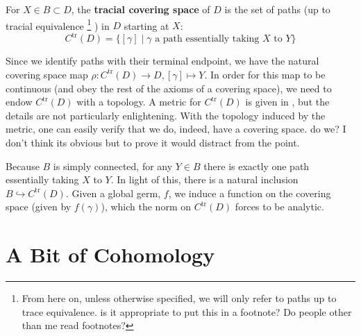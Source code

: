 \begin{definition}%
\label{def:trcover}
  For \(X \in B \subset D\), the \textbf{tracial covering space} of \(D\) is the
  set of paths (up to tracial equivalence
  \footnote{From here on, unless otherwise specified, we will only refer to
    paths up to trace equivalence. {\color{red} is it appropriate to put this in
    a footnote? Do people other than me read footnotes?} }
  ) in \(D\) starting at \(X\):
  \[
    C^{\textrm{tr}}(D) = \{[\gamma] \mid \gamma \text{ a path essentially taking
    \(X\) to \(Y\)}\}
  \]
\end{definition}

Since we identify paths with their terminal endpoint, we have the natural
covering space map \(\rho: C^{\textrm{tr}}(D) \to D, [\gamma]\mapsto Y\). In order
for this map to be continuous (and obey the rest of the axioms of a covering
space), we need to endow \(C^{\textrm{tr}}(D)\) with a topology. A metric for
\(C^{\textrm{tr}}(D)\) is given in
\cite{pascoeFreeNoncommutativePrincipal2020}, but the details are not
particularly enlightening. With the topology induced by the metric, one can
easily verify that we do, indeed, have a covering space. {\color{red} do we? I
  don't think its obvious but to prove it would distract from the point.}

Because \(B\) is simply connected, for any \(Y \in B\) there is exactly one path
essentially taking \(X\) to \(Y\). In light of this, there is a natural
inclusion \(B \hookrightarrow C^{\textrm{tr}}(D)\). Given a global germ, \(f\),
we induce a function on the covering space (given by \(f(\gamma)\)), which the
norm on \(C^{\textrm{tr}}(D)\) forces to be analytic.

\section{A Bit of Cohomology}%
\label{sec:cohomo}

